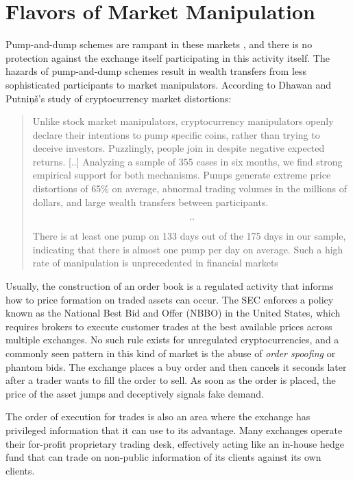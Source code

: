 \section{Flavors of Market Manipulation}


Pump-and-dump schemes are rampant in these markets
\cite{shifflett_traders_2018}, and there is no protection against the exchange
itself participating in this activity itself. The hazards of pump-and-dump
schemes result in wealth transfers from less sophisticated participants to
market manipulators. According to Dhawan and Putniņš's study
\cite{dhawan_new_2020} of cryptocurrency market distortions:

\begin{quote}
Unlike stock market manipulators, cryptocurrency manipulators openly declare
their intentions to pump specific coins, rather than trying to deceive
investors. Puzzlingly, people join in despite negative expected returns.
[..] Analyzing a sample of 355 cases in six months, we find strong empirical
support for both mechanisms. Pumps generate extreme price distortions of 65\%
on average, abnormal trading volumes in the millions of dollars, and large
wealth transfers between participants.

\[..\]

There is at least one pump on 133 days out of the 175 days in our
sample, indicating that there is almost one pump per day on average.
Such a high rate of manipulation is unprecedented in financial markets
\end{quote}

Usually, the construction of an order book is a regulated activity that informs
how to price formation on traded assets can occur. The SEC enforces a policy
known as the National Best Bid and Offer (NBBO) in the United States, which
requires brokers to execute customer trades at the best available prices across
multiple exchanges. No such rule exists for unregulated cryptocurrencies, and a
commonly seen pattern in this kind of market is the abuse of \textit{order
spoofing} or phantom bids. The exchange places a buy order and then cancels it
seconds later after a trader wants to fill the order to sell. As soon as the
order is placed, the price of the asset jumps and deceptively signals fake
demand.
\cite{cong_crypto_2020}


The order of execution for trades is also an area where the exchange has
privileged information that it can use to its advantage. Many exchanges operate
their for-profit proprietary trading desk, effectively acting like an in-house
hedge fund that can trade on non-public information of its clients against its
own clients.

